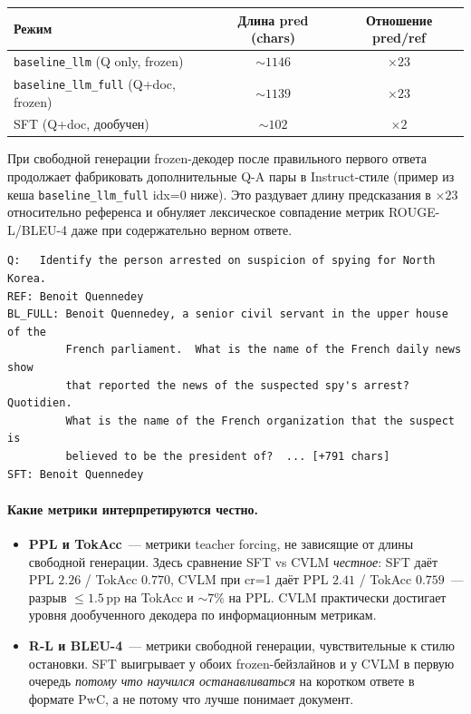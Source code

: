 \documentclass[a4paper,12pt]{extarticle}
\begin{document}
\begin{center}
\footnotesize
\begin{tabular}{lcc}
\toprule
\textbf{Режим} & \textbf{Длина pred (chars)} & \textbf{Отношение pred/ref} \\
\midrule
\texttt{baseline\_llm} (Q only, frozen)        & $\sim 1146$ & $\times 23$ \\
\texttt{baseline\_llm\_full} (Q+doc, frozen)   & $\sim 1139$ & $\times 23$ \\
SFT (Q+doc, дообучен)                          & $\sim 102$  & $\times 2$ \\
\bottomrule
\end{tabular}
\end{center}

При свободной генерации frozen-декодер после правильного первого ответа продолжает фабриковать дополнительные Q-A пары в Instruct-стиле (пример из кеша \texttt{baseline\_llm\_full} idx=0 ниже). Это раздувает длину предсказания в $\times 23$ относительно референса и обнуляет лексическое совпадение метрик ROUGE-L/BLEU-4 даже при содержательно верном ответе.

\begin{verbatim}
Q:   Identify the person arrested on suspicion of spying for North Korea.
REF: Benoit Quennedey
BL_FULL: Benoit Quennedey, a senior civil servant in the upper house of the
         French parliament.  What is the name of the French daily news show
         that reported the news of the suspected spy's arrest?  Quotidien.
         What is the name of the French organization that the suspect is
         believed to be the president of?  ... [+791 chars]
SFT: Benoit Quennedey
\end{verbatim}

\paragraph{Какие метрики интерпретируются честно.}
\begin{itemize}
    \item \textbf{PPL и TokAcc}~--- метрики teacher forcing, не зависящие от длины свободной генерации. Здесь сравнение SFT vs CVLM \emph{честное}: SFT даёт PPL $2.26$ / TokAcc $0.770$, CVLM при cr=1 даёт PPL $2.41$ / TokAcc $0.759$~--- разрыв $\le 1.5$\,pp на TokAcc и $\sim 7\%$ на PPL. CVLM практически достигает уровня дообученного декодера по информационным метрикам.
    \item \textbf{R-L и BLEU-4}~--- метрики свободной генерации, чувствительные к стилю остановки. SFT выигрывает у обоих frozen-бейзлайнов и у CVLM в первую очередь \emph{потому что научился останавливаться} на коротком ответе в формате PwC, а не потому что лучше понимает документ.
\end{itemize}
\end{document}
